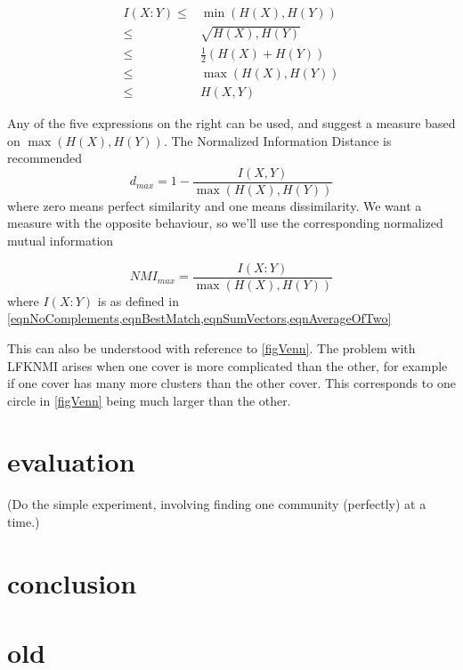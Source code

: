 \documentclass[9pt,technote]{IEEEtran}
\begin{document}
\begin{equation}
	\begin{split}
	I(X:Y) \leq & \min(H(X),H(Y)) \\
	       \leq & \sqrt{H(X),H(Y)} \\
	       \leq & \frac12 \left(H(X)+H(Y)\right) \\
	       \leq & \max(H(X),H(Y)) \\
	       \leq & H(X,Y)
	\end{split}
\end{equation}

Any of the five expressions on the right can be used, and \cite{VinhEppsBailey} suggest
a measure based on $\max(H(X),H(Y))$. The Normalized Information Distance is recommended
\begin{equation*}
	d_{max} = 1 - \frac{ I(X,Y) }{ \max(H(X),H(Y)) }
\end{equation*}
where zero means perfect similarity and one means dissimilarity. We want a measure with
the opposite behaviour, so we'll use the corresponding normalized mutual information

\begin{equation}
	NMI_{max} = \frac{ I(X:Y) }{ \max(H(X),H(Y)) }
\end{equation}
where $I(X:Y)$ is as defined in \cref{eqnNoComplements,eqnBestMatch,eqnSumVectors,eqnAverageOfTwo}


This can also be understood with reference to \cref{figVenn}. The problem with LFKNMI arises
when one cover is more complicated than the other, for example if one cover has many
more clusters than the other cover.
This corresponds to one circle in \cref{figVenn} being much larger than the other.


\section{evaluation}
\label{secEval}

(Do the simple experiment, involving finding one community (perfectly) at a time.)

\section{conclusion}







\break

\section{old}
\end{document}
